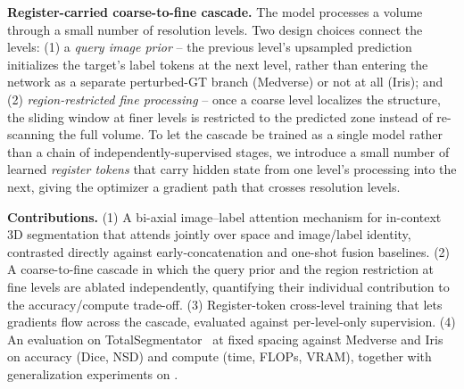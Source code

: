 \vspace{0.3em}\noindent\textbf{Register-carried coarse-to-fine cascade.}
The model processes a volume through a small number of resolution
levels. Two design choices connect the levels: (1) a \emph{query image
prior} -- the previous level's upsampled prediction initializes the
target's label tokens at the next level, rather than entering the
network as a separate perturbed-GT branch (Medverse) or not at all
(Iris); and (2) \emph{region-restricted fine processing} -- once a
coarse level localizes the structure, the sliding window at finer levels
is restricted to the predicted zone instead of re-scanning the full
volume. To let the cascade be trained as a single model rather than a
chain of independently-supervised stages, we introduce a small number of
learned \emph{register tokens} that carry hidden state from one level's
processing into the next, giving the optimizer a gradient path that
crosses resolution levels.

\vspace{0.3em}\noindent\textbf{Contributions.} (1) A bi-axial
image--label attention mechanism for in-context 3D segmentation that
attends jointly over space and image/label identity, contrasted directly
against early-concatenation and one-shot fusion baselines. (2) A
coarse-to-fine cascade in which the query prior and the region
restriction at fine levels are ablated independently, quantifying their
individual contribution to the accuracy/compute trade-off. (3)
Register-token cross-level training that lets gradients flow across the
cascade, evaluated against per-level-only supervision. (4) An evaluation
on TotalSegmentator~\cite{wasserthalTotalSegmentatorRobustSegmentation2023}
at fixed spacing against Medverse and Iris on accuracy (Dice, NSD) and
compute (time, FLOPs, VRAM), together with generalization experiments on
.
